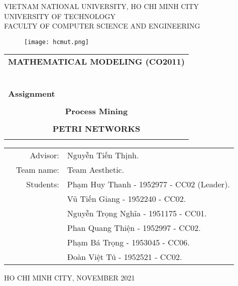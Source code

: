 \documentclass[a4paper]{article}
\begin{document}
\begin{titlepage}
\begin{center}
VIETNAM NATIONAL UNIVERSITY, HO CHI MINH CITY \\
UNIVERSITY OF TECHNOLOGY \\
FACULTY OF COMPUTER SCIENCE AND ENGINEERING
\end{center}

\vspace{1cm}

\begin{figure}[h!]
\begin{center}
\texttt{[image: hcmut.png]}
\end{center}
\end{figure}

\vspace{1cm}


\begin{center}
\begin{tabular}{c}
\multicolumn{1}{l}{\textbf{{\Large MATHEMATICAL MODELING (CO2011)}}}\\
~~\\
\hline
\\
\multicolumn{1}{l}{\textbf{{\Large Assignment}}}\\
\\
\textbf{{\Huge Process Mining}}\\
\\
\textbf{{\Huge PETRI NETWORKS}}\\
\\
\hline
\end{tabular}
\end{center}

\vspace{1 cm}

\begin{center}
\begin{table}[h]
\begin{tabular}{rrl}
\hspace{2 cm} & Advisor: & Nguyễn Tiến Thịnh.\\
& Team name: &Team Aesthetic. \\
& Students: & Phạm Huy Thanh - 1952977 - CC02 (Leader). \\
& & Vũ Tiến Giang - 1952240 - CC02. \\
& & Nguyễn Trọng Nghĩa - 1951175 - CC01. \\
& & Phan Quang Thiện - 1952997 - CC02. \\
& & Phạm Bá Trọng - 1953045 - CC06. \\
& & Đoàn Việt Tú - 1952521 - CC02. \\
\end{tabular}
\end{table}
\end{center}

\vspace{1 cm}

\begin{center}
{\footnotesize HO CHI MINH CITY, NOVEMBER 2021}
\end{center}
\end{titlepage}
\end{document}
